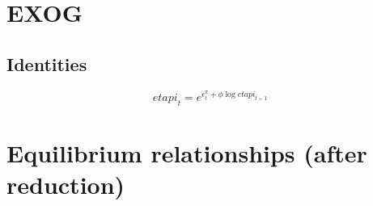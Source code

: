 \section{EXOG}

\subsection{Identities}

\begin{equation}
{e\!t\!a\!p\!i}_{t} = e^{\epsilon^{\pi}_{t} + {\phi} {\log{{e\!t\!a\!p\!i}_{t-1}}}}
\end{equation}




\section{Equilibrium relationships (after reduction)}

